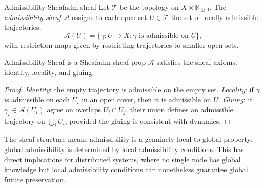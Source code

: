 \documentclass[12pt,twoside,openright]{book}
\begin{document}
\begin{definition}{Admissibility Sheaf}{adm-sheaf}
  Let $\mathcal{T}$ be the topology on
  $X\times\mathbb{R}_{\ge0}$. The \emph{admissibility sheaf}
  $\mathcal{A}$ assigns to each open set $U\in\mathcal{T}$
  the set of locally admissible trajectories,
  \[
    \mathcal{A}(U)
    = \{\gamma : U \to X : \gamma \text{ is admissible on } U\},
  \]
  with restriction maps given by restricting trajectories
  to smaller open sets.
\end{definition}

\begin{proposition}{Admissibility Sheaf is a Sheaf}{adm-sheaf-prop}
  $\mathcal{A}$ satisfies the sheaf axioms: identity,
  locality, and gluing.
\end{proposition}

\begin{proof}
  \emph{Identity}: the empty trajectory is admissible on
  the empty set. \emph{Locality}: if $\gamma$ is admissible
  on each $U_i$ in an open cover, then it is admissible on
  $U$. \emph{Gluing}: if $\gamma_i\in\mathcal{A}(U_i)$
  agree on overlaps $U_i\cap U_j$, their union defines an
  admissible trajectory on $\bigcup_i U_i$, provided the
  gluing is consistent with dynamics.
\end{proof}

The sheaf structure means admissibility is a genuinely
local-to-global property: global admissibility is
determined by local admissibility conditions. This has
direct implications for distributed systems, where no
single node has global knowledge but local admissibility
conditions can nonetheless guarantee global future
preservation.
\end{document}
